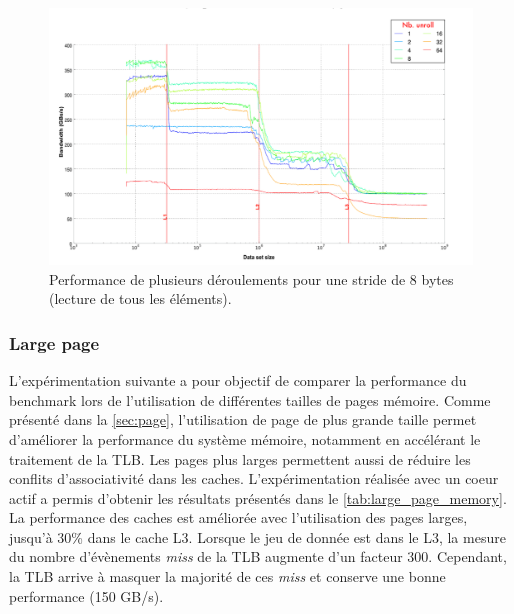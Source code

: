     \begin{figure}
    \center
    \includegraphics[width=16cm]{images/dml_unroll_best.png}
    \caption{\label{pic:dml_unroll_best} Performance de plusieurs déroulements pour une stride de 8 bytes (lecture de tous les éléments).}
    \end{figure}
    
    
    \subsubsection{Large page} \label{sec:dml_large_page}

    L'expérimentation suivante a pour objectif de comparer la performance du benchmark lors de l'utilisation de différentes tailles de pages mémoire. Comme présenté dans la \autoref{sec:page}, l'utilisation de page de plus grande taille permet d'améliorer la performance du système mémoire, notamment en accélérant le traitement de la TLB. Les pages plus larges permettent aussi de réduire les conflits d'associativité dans les caches. L'expérimentation réalisée avec un coeur actif a permis d'obtenir les résultats présentés dans le \autoref{tab:large_page_memory}. La performance des caches est améliorée avec l'utilisation des pages larges, jusqu'à 30\% dans le cache L3. Lorsque le jeu de donnée est dans le L3, la mesure du nombre d'évènements \textit{miss} de la TLB augmente d'un facteur 300. Cependant, la TLB arrive à masquer la majorité de ces \textit{miss} et conserve une bonne performance (150 GB/s).

